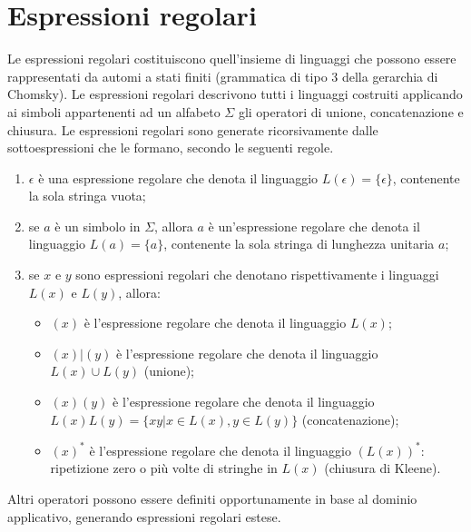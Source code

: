 \section{Espressioni regolari}
Le espressioni regolari costituiscono quell'insieme di linguaggi che possono essere rappresentati da automi a stati finiti (grammatica di tipo 3 della gerarchia di Chomsky). Le espressioni regolari descrivono tutti i linguaggi costruiti applicando ai simboli appartenenti ad un alfabeto $\Sigma$ gli operatori di unione, concatenazione e chiusura. Le espressioni regolari sono generate ricorsivamente dalle sottoespressioni che le formano, secondo le seguenti regole.
\begin{enumerate}
\item $\epsilon$ è una espressione regolare che denota il linguaggio $L(\epsilon) = \{\epsilon\}$, 					contenente la sola stringa vuota;
\item se $a$  è un simbolo in $\Sigma$, allora $a$ è un'espressione regolare che denota il linguaggio $L(a) = 	\{a\}$, contenente la sola stringa di lunghezza unitaria $a$;
\item se $x$ e $y$ sono espressioni regolari che denotano rispettivamente i linguaggi $L(x)$ e $L(y)$, allora:
	\begin{itemize}
	\item $(x)$ è l'espressione regolare che denota il linguaggio $L(x)$;
	\item $(x) | (y)$ è l'espressione regolare che denota il linguaggio $L(x) \cup L(y)$ (unione);
	\item $(x)(y)$ è l'espressione regolare che denota il linguaggio $L(x)L(y) = \{xy | x \in L(x), y \in L(y)\}$ (concatenazione);
	\item $(x)^*$ è l'espressione regolare che denota il linguaggio $(L(x))^*$: ripetizione zero o più volte di stringhe in $L(x)$ (chiusura di Kleene).
	\end{itemize}
\end{enumerate}
Altri operatori possono essere definiti opportunamente in base al dominio applicativo, generando espressioni regolari estese.

